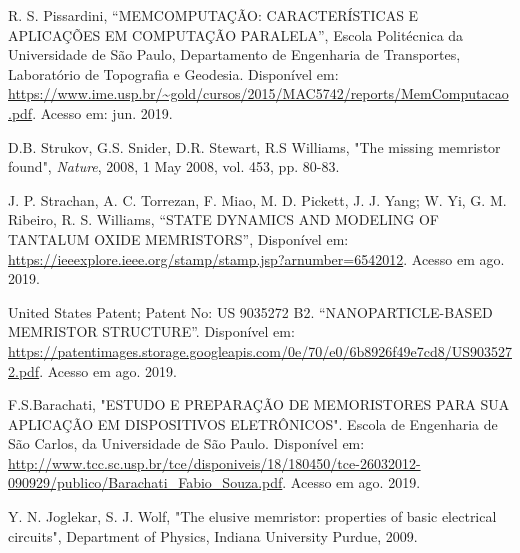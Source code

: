 \documentclass{ceel}
\begin{document}
\begin{multicols}{2}
\begin{thebibliography}{9}
    R. S. Pissardini,
    “MEMCOMPUTAÇÃO: CARACTERÍSTICAS E APLICAÇÕES EM
COMPUTAÇÃO PARALELA”, Escola Politécnica da Universidade de São Paulo, Departamento de Engenharia de Transportes, Laboratório de Topografia e Geodesia.
 Disponível em:
 \url{https://www.ime.usp.br/~gold/cursos/2015/MAC5742/reports/MemComputacao.pdf}. Acesso em: jun. 2019.

 

   
     D.B. Strukov, G.S. Snider, D.R. Stewart,  R.S Williams, 
"The missing memristor found", 
\emph{Nature}, 2008, 1 May 2008, vol. 453, pp. 80-83.

    J. P. Strachan, A. C. Torrezan, F. Miao, M. D. Pickett, J. J. Yang; W. Yi, G. M. Ribeiro, R. S. Williams, “STATE DYNAMICS AND MODELING OF TANTALUM OXIDE MEMRISTORS”, Disponível em: \url{https://ieeexplore.ieee.org/stamp/stamp.jsp?arnumber=6542012}. Acesso em ago. 2019.
    
    United States Patent; Patent No: US 9035272 B2. “NANOPARTICLE-BASED MEMRISTOR STRUCTURE”. Disponível em: \url{https://patentimages.storage.googleapis.com/0e/70/e0/6b8926f49e7cd8/US9035272.pdf}. Acesso em ago. 2019.
    
   F.S.Barachati, "ESTUDO E PREPARAÇÃO DE MEMORISTORES PARA SUA APLICAÇÃO EM DISPOSITIVOS ELETRÔNICOS". Escola de Engenharia de São Carlos, da Universidade de São Paulo. Disponível em: \url{http://www.tcc.sc.usp.br/tce/disponiveis/18/180450/tce-26032012-090929/publico/Barachati_Fabio_Souza.pdf}. 
   Acesso em ago. 2019.

    Y. N. Joglekar, S. J. Wolf, "The elusive memristor: properties of basic electrical circuits", Department of Physics, Indiana University Purdue, 2009.


\end{thebibliography}
\end{multicols}
\end{document}
